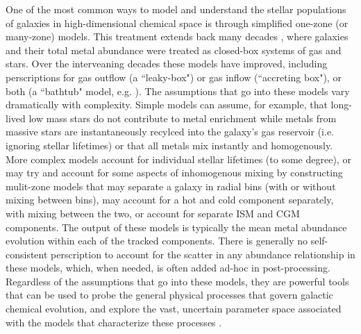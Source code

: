  One of the most common ways to model and understand the stellar populations of galaxies in high-dimensional chemical space is through simplified one-zone (or many-zone) models. This treatment extends back many decades \citep[e.g.][]{Schmidt1963,TalbotArnett1971,Lynden-Bell1975}, where galaxies and their total metal abundance were treated as closed-box systems of gas and stars. Over the interveaning decades these models have improved, including perscriptions for gas outflow (a ``leaky-box") or gas inflow (``accreting box"), or both (a ``bathtub" model, e.g. \cite{FinlatorDave2008,Bouche2010}). The assumptions that go into these models vary dramatically with complexity. Simple models can assume, for example, that long-lived low mass stars do not contribute to metal enrichment while metals from massive stars are instantaneously recylced into the galaxy's gas reservoir (i.e. ignoring stellar lifetimes) or that all metals mix instantly and homogenously. More complex models account for individual stellar lifetimes (to some degree), or may try and account for some aspects of inhomogenous mixing by constructing mulit-zone models that may separate a galaxy in radial bins (with or without mixing between bins), may account for a hot and cold component separately, with mixing between the two, or account for separate ISM and CGM components. The output of these models is typically the mean metal abundance evolution within each of the tracked components. There is generally no self-consistent perscription to account for the scatter in any abundance relationship in these models, which, when needed, is often added ad-hoc in post-processing. Regardless of the assumptions that go into these models, they are powerful tools that can be used to probe the general physical processes that govern galactic chemical evolution, and explore the vast, uncertain parameter space associated with the models that characterize these processes \citep[e.g.][]{Cote2017a}.
 

